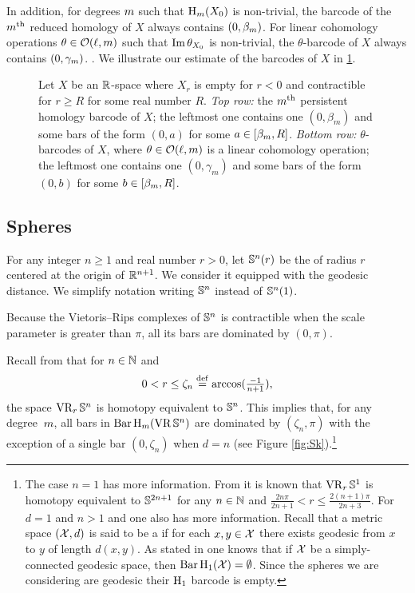 In addition, for degrees $m$ such that $\mathrm{H}_m(X_0)$ is non-trivial, the barcode of the $m^{\mathrm{th}}$ reduced homology of $X$ always contains $(0,\beta_m )$.
For linear cohomology operations $\theta \in \mathcal{O}(\ell, m)$ such that $\operatorname{Im} \theta_{X_0}$ is non-trivial, the $\theta$-barcode of $X$ always contains $(0,\gamma_m)$.
.
We illustrate our estimate of the barcodes of $X$ in \cref{fig:barcodes_general}.

\begin{figure}
	\centering
	
	\caption{Let $X$ be an $\mathbb{R}$-space where $X_r$ is empty for $r<0$ and contractible for $r\geq R$ for some real number $R$. \emph{Top row:} the $m^{\mathrm{th}}$ persistent homology barcode of $X$; the leftmost one contains one $(0,\beta_m)$ and some bars of the form $(0,a)$ for some $a\in [\beta_m, R]$.
		\emph{Bottom row:} $\theta$-barcodes of $X$, where $\theta\in\mathcal{O}(\ell,m)$ is a linear cohomology operation; the leftmost one contains one $(0,\gamma_m)$ and some bars of the form $(0,b)$ for some $b\in [\beta_m, R]$.}
	\label{fig:barcodes_general}
\end{figure}

\subsection{Spheres}\label{ss:Sn}

For any integer $n \geq 1$ and real number $r > 0$, let $\mathbb{S}^n(r)$ be the  of radius $r$ centered at the origin of $\mathbb{R}^{n+1}$.
We consider it equipped with the geodesic distance.
We simplify notation writing \(\mathbb{S}^n\) instead of \(\mathbb{S}^n(1)\).

Because the Vietoris--Rips complexes of $\mathbb{S}^n$ is contractible when the scale parameter is greater than $\pi$, all its bars are dominated by $(0, \pi)$.

Recall from \cite[Thm.~7.1]{lim2020vietoris} that for $n \in \mathbb{N}$ and
\[
0 < r \leq \zeta_n \stackrel{\mathrm{def}}{=} \arccos(\tfrac{-1}{n+1}),
\]
the space $\operatorname{VR}_r\mathbb{S}^n$ is homotopy equivalent to $\mathbb{S}^n$.
This implies that, for any degree~$m$, all bars in $\operatorname{Bar}\mathrm{H}_m (\operatorname{VR}\mathbb{S}^n)$ are dominated by $(\zeta_n,\pi)$ with the exception of a single bar $(0,\zeta_n)$ when $d = n$ (see Figure \ref{fig:Sk}).\footnote{
	The case $n = 1$ has more information.
	From \cite[Thm.~7.4]{adamaszek2017vietoris} it is known that $\operatorname{VR}_r\mathbb{S}^1$ is homotopy equivalent to $\mathbb{S}^{2n+1}$ for any $n \in \mathbb{N}$ and $\frac{2n\pi}{2n+1} < r \leq \frac{2(n+1)\pi}{2n+3}$.
	For $d=1$ and $n > 1$ and one also has more information.
	Recall that a metric space $(\mathcal{X}, d)$ is said to be a  if for each $x, y \in \mathcal{X}$ there exists geodesic from $x$ to $y$ of length $d(x, y)$.
	As stated in \cite[Prop.~7.10]{virk20201} one knows that if $\mathcal{X}$ be a simply-connected geodesic space, then $\operatorname{Bar}\mathrm{H}_1(\mathcal{X}) = \emptyset$.
	Since the spheres we are considering are geodesic their $\mathrm{H}_1$ barcode is empty.}

